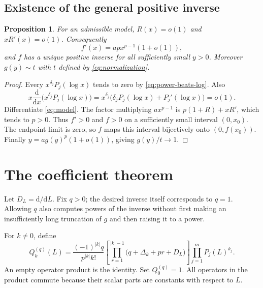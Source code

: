 \documentclass[11pt,a4paper]{article}
\newtheorem{proposition}[theorem]{Proposition}
\theoremstyle{definition}
\theoremstyle{remark}
\newcommand{\dd}{\mathrm d}
\begin{document}
\subsection{Existence of the general positive inverse}

\begin{proposition}\label{prop:localinverse}
For an admissible model, $R(x)=o(1)$ and $xR'(x)=o(1)$. Consequently
\[
 f'(x)=apx^{p-1}(1+o(1)),
\]
and $f$ has a unique positive inverse for all sufficiently small $y>0$.
Moreover $g(y)\sim t$ with $t$ defined by \eqref{eq:normalization}.
\end{proposition}

\begin{proof}
Every $x^{\delta_j}P_j(\log x)$ tends to zero by
\eqref{eq:power-beats-log}. Also
\[
 x\frac{\dd}{\dd x}\bigl(x^{\delta_j}P_j(\log x)\bigr)
 =x^{\delta_j}\bigl(\delta_jP_j(\log x)+P_j'(\log x)\bigr)=o(1).
\]
Differentiate \eqref{eq:model}. The factor multiplying $ax^{p-1}$ is
$p(1+R)+xR'$, which tends to $p>0$. Thus $f'>0$ and $f>0$ on a sufficiently
small interval $(0,x_0)$. The endpoint limit is zero, so $f$ maps this interval
bijectively onto $(0,f(x_0))$. Finally $y=ag(y)^p(1+o(1))$, giving $g(y)/t\to1$.
\end{proof}

\section{The coefficient theorem}
\label{sec:theorem}

Let $D_L=\dd/\dd L$. Fix $q>0$; the desired inverse itself corresponds to
$q=1$. Allowing $q$ also computes powers of the inverse without first making an
insufficiently long truncation of $g$ and then raising it to a power.

For $k\ne0$, define
\begin{equation}\label{eq:Qk}
 \boxed{\displaystyle
 Q_k^{(q)}(L)=
 \frac{(-1)^{|k|}q}{p^{|k|}k!}
 \left[\prod_{r=1}^{|k|-1}
       \bigl(q+\Delta_k+pr+D_L\bigr)\right]
 \prod_{j=1}^{m}P_j(L)^{k_j}.}
\end{equation}
An empty operator product is the identity. Set $Q_0^{(q)}=1$.
All operators in the product commute because their scalar parts are constants
with respect to $L$.
\end{document}
